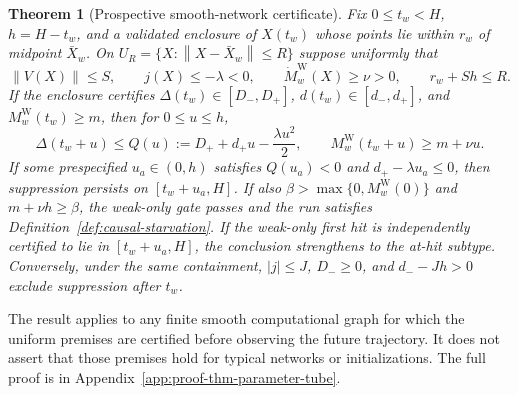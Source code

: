 \documentclass{article}
\newtheorem{theorem}{Theorem}
\theoremstyle{definition}
\theoremstyle{remark}
\newcommand{\norm}[1]{\left\lVert #1\right\rVert}
\newcommand{\Wcond}{\mathrm{W}}
\begin{document}
\begin{theorem}[Prospective smooth-network certificate]
\label{thm:parameter-tube}
Fix $0\le t_w<H$, $h=H-t_w$, and a validated enclosure of $X(t_w)$ whose points lie within $r_w$ of midpoint $\bar X_w$. On $U_R=\{X:\norm{X-\bar X_w}\le R\}$ suppose uniformly that
\begin{equation}
 \norm{V(X)}\le S,\qquad j(X)\le-\lambda<0,\qquad \dot M_w^{\Wcond}(X)\ge\nu>0,
 \qquad r_w+Sh\le R.
 \label{eq:prospective-premises}
\end{equation}
If the enclosure certifies $\Delta(t_w)\in[D_-,D_+]$, $d(t_w)\in[d_-,d_+]$, and $M_w^{\Wcond}(t_w)\ge m$, then for $0\le u\le h$,
\begin{equation}
 \Delta(t_w+u)\le Q(u):=D_++d_+u-\frac{\lambda u^2}{2},
 \qquad M_w^{\Wcond}(t_w+u)\ge m+\nu u.
 \label{eq:prospective-envelope}
\end{equation}
If some prespecified $u_a\in(0,h)$ satisfies $Q(u_a)<0$ and $d_+-\lambda u_a\le0$, then suppression persists on $[t_w+u_a,H]$. If also $\beta>\max\{0,M_w^{\Wcond}(0)\}$ and $m+\nu h\ge\beta$, the weak-only gate passes and the run satisfies Definition~\ref{def:causal-starvation}. If the weak-only first hit is independently certified to lie in $[t_w+u_a,H]$, the conclusion strengthens to the at-hit subtype. Conversely, under the same containment, $|j|\le J$, $D_-\ge0$, and $d_--Jh>0$ exclude suppression after $t_w$.
\end{theorem}
The result applies to any finite smooth computational graph for which the uniform premises are certified before observing the future trajectory. It does not assert that those premises hold for typical networks or initializations. The full proof is in Appendix~\ref{app:proof-thm-parameter-tube}.
\end{document}
